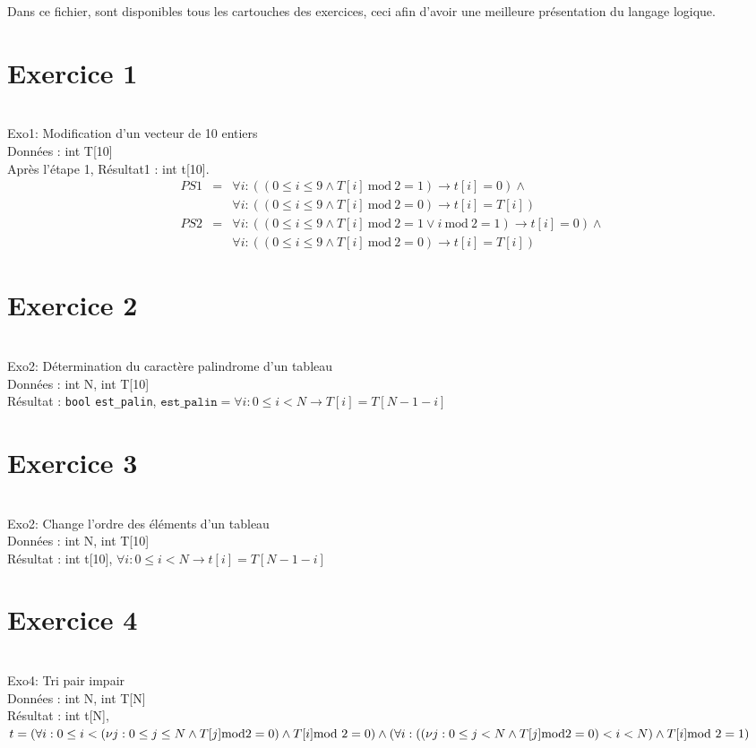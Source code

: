 \documentclass{article}
\newcommand{\mod}{\textrm{mod}}
\begin{document}
	\maketitle
	Dans ce fichier, sont disponibles tous les cartouches des exercices, ceci afin d'avoir une meilleure présentation du langage logique.
	\section{Exercice 1}
	~\\
	Exo1: Modification d'un vecteur de 10 entiers\\
	Données : int T[10]\\
	Après l'étape 1, Résultat1 : int t[10].
	\begin{eqnarray*}
		PS1 &=& \forall i : ( ( 0 \leq i \leq 9 \wedge T[i]\ \mod\ 2 = 1) \rightarrow t[i]= 0) \wedge \\&&\forall i : ( ( 0 \leq i \leq 9 \wedge T[i]\ \mod\ 2 = 0) \rightarrow t[i] = T[i])\\
		PS2 &=& \forall i : ( ( 0 \leq i \leq 9 \wedge T[i]\ \mod\ 2 = 1 \vee i\ \mod\ 2 = 1) \rightarrow t[i] = 0) \wedge \\&&\forall i : ( ( 0 \leq i \leq 9 \wedge T[i]\ \mod\ 2 = 0) \rightarrow t[i] = T[i])
	\end{eqnarray*}
	\section{Exercice 2}
	~\\
	Exo2: Détermination du caractère palindrome d'un tableau\\
	Données : int N, int T[10]\\
	Résultat : \texttt{bool} \texttt{est\_palin}, $\texttt{est\_palin} =  \forall i : 0 \leq i < N \rightarrow T[i] = T[N - 1 -i]$
	\section{Exercice 3}
	~\\
	Exo2: Change l'ordre des éléments d'un tableau \\
	Données : int N, int T[10]\\
	Résultat : int t[10], $\forall i : 0 \leq i < N \rightarrow t[i]=T[N-1-i]$

	\section{Exercice 4}
	~\\
	Exo4: Tri pair impair\\
	Données : int N, int T[N]\\
	Résultat : int t[N], \\
	
	$t=(\forall i : 0 \leq i < (\nu j : 0 \leq j \leq N \wedge T[j] \mod 2 = 0) \wedge T[i] \mod\ 2 = 0) \wedge\\
	(
		\forall i : ((\nu j : 0 \leq j < N \wedge T[j] \mod 2 = 0) < i < N) \wedge T[i] \mod\ 2 = 1
	)$ 
\end{document}
